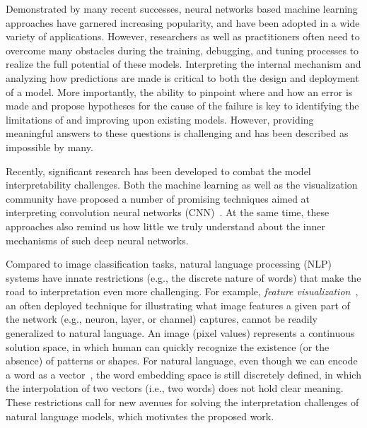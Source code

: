 \maketitle

Demonstrated by many recent successes, neural networks based machine learning approaches have garnered increasing popularity, and have been adopted in a wide variety of applications.
%
However, researchers as well as practitioners often need to overcome many obstacles during the training, debugging, and tuning processes to realize the full potential of these models.
%
Interpreting the internal mechanism and analyzing how predictions are made is critical to both the design and deployment of a model.
More importantly, the ability to pinpoint where and how an error is made and propose hypotheses for the cause of the failure is key to identifying the limitations of and improving upon existing models.
However, providing meaningful answers to these questions is challenging and has been described as impossible by many.

Recently, significant research has been developed to combat the model interpretability challenges.
Both the machine learning as well as the visualization community have proposed a number of promising techniques aimed at interpreting convolution neural networks (CNN)~\cite{SimonyanVedaldiZisserman2013, ZeilerFergus2014, YosinskiCluneNguyen2015, OlahMordvintsevSchubert2017, LiuShiLi2017, OlahSatyanarayanJohnson2018, BilalJourablooYe2018}. 
At the same time, these approaches also remind us how little we truly understand about the inner mechanisms of such deep neural networks.

Compared to image classification tasks, natural language processing (NLP) systems have innate restrictions (e.g., the discrete nature of words) that make the road to interpretation even more challenging.
For example, \emph{feature visualization}~\cite{OlahMordvintsevSchubert2017}, an often deployed technique for illustrating what image features a given part of the network (e.g., neuron, layer, or channel) captures, cannot be readily generalized to natural language. 
An image (pixel values) represents a continuous solution space, in which human can quickly recognize the existence (or the absence) of patterns or shapes. 
For natural language, even though we can encode a word as a vector~\cite{MikolovSutskeverChen2013, PenningtonSocherManning2014}, the word embedding space is still discretely defined, in which the interpolation of two vectors (i.e., two words) does not hold clear meaning.
%
These restrictions call for new avenues for solving the interpretation challenges of natural language models, which motivates the proposed work.


